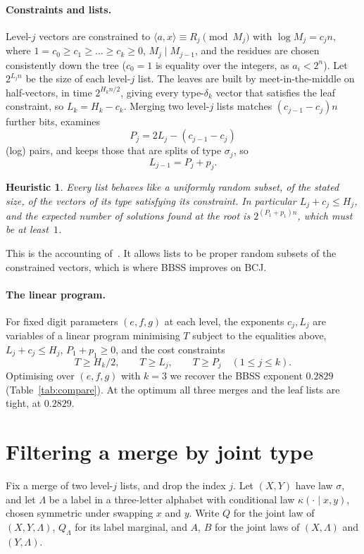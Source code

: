 \documentclass[11pt]{article}
\newtheorem{heuristic}{Heuristic}
\theoremstyle{definition}
\theoremstyle{remark}
\begin{document}
\paragraph{Constraints and lists.} Level-$j$ vectors are constrained to $\langle a,x\rangle\equiv R_j\pmod{M_j}$ with
$\log M_j=c_jn$, where $1=c_0\ge c_1\ge\dots\ge c_k\ge0$, $M_{j}\mid M_{j-1}$, and the residues are chosen
consistently down the tree ($c_0=1$ is equality over the integers, as $a_i<2^n$). Let $2^{L_jn}$ be the size of
each level-$j$ list. The leaves are built by meet-in-the-middle on half-vectors, in time $2^{H_kn/2}$, giving every
type-$\delta_k$ vector that satisfies the leaf constraint, so $L_k=H_k-c_k$. Merging two level-$j$ lists matches
$(c_{j-1}-c_j)n$ further bits, examines
\[
P_j=2L_j-(c_{j-1}-c_j)
\]
(log) pairs, and keeps those that are splits of type $\sigma_j$, so
\[
L_{j-1}=P_j+p_j .
\]

\begin{heuristic}\label{heur:lists}
Every list behaves like a uniformly random subset, of the stated size, of the vectors of its type satisfying its
constraint. In particular $L_j+c_j\le H_j$, and the expected number of solutions found at the root is
$2^{(P_1+p_1)n}$, which must be at least~$1$.
\end{heuristic}
This is the accounting of~\cite{BBSS20}. It allows lists to be proper random subsets of the constrained vectors,
which is where BBSS improves on BCJ.

\paragraph{The linear program.} For fixed digit parameters $(e,f,g)$ at each level, the exponents
$c_j,L_j$ are variables of a linear program minimising $T$ subject to the equalities above,
$L_j+c_j\le H_j$, $P_1+p_1\ge0$, and the cost constraints
\[
T\ge H_k/2,\qquad T\ge L_j,\qquad T\ge P_j\quad(1\le j\le k).
\]
Optimising over $(e,f,g)$ with $k=3$ we recover the BBSS exponent $0.2829$ (Table~\ref{tab:compare}). At the
optimum all three merges and the leaf lists are tight, at $0.2829$.

\section{Filtering a merge by joint type}\label{sec:filter}
Fix a merge of two level-$j$ lists, and drop the index $j$. Let $(X,Y)$ have law $\sigma$, and let $\Lambda$ be a
label in a three-letter alphabet with conditional law $\kappa(\cdot\mid x,y)$, chosen symmetric under swapping $x$ and $y$.
Write $Q$ for the joint law of $(X,Y,\Lambda)$, $Q_\Lambda$ for its label marginal, and $A$, $B$ for the joint laws of
$(X,\Lambda)$ and $(Y,\Lambda)$.
\end{document}

